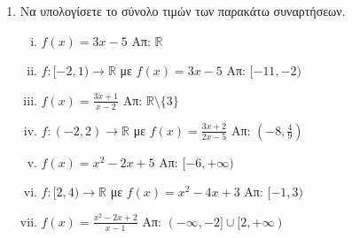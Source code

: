 \begin{enumerate}
  \item Να υπολογίσετε το σύνολο τιμών των παρακάτω συναρτήσεων.
    \begin{enumerate}[i)]
      \item $ f(x) = 3x-5 $ \hfill Απ: $ \mathbb{R} $ 
      \item $ f \colon [-2,1) \to \mathbb{R} $ με $ f(x) = 3x-5 $ 
        \hfill Απ: $ [-11,-2) $ 
      \item $ f(x) = \frac{3x+1}{x-2} $ \hfill Απ: 
        $ \mathbb{R} \setminus \{ 3 \} $ 
      \item $ f \colon (-2,2) \to \mathbb{R} $ με $ f(x) = \frac{3x+2}{2x-5} $
        \hfill Απ: $ \left(-8, \frac{4}{9}\right) $ 
      \item $ f(x) = x^{2}-2x+5 $ \hfill Απ: $ [-6,+\infty) $ 
      \item $ f \colon [2,4) \to \mathbb{R} $ με $ f(x) = x^{2}-4x+3 $
        \hfill Απ: $ [-1,3) $
      \item $ f(x) = \frac{x^{2}-2x+2}{x-1} $ \hfill Απ:
        $ (-\infty,-2] \cup [2,+\infty) $
    \end{enumerate}
\end{enumerate}







